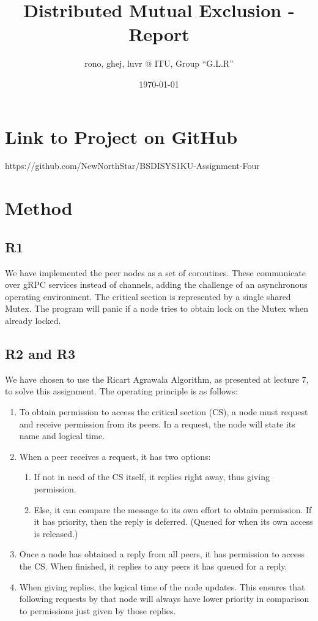 \documentclass[a4paper,11pt]{article}
\title{Distributed Mutual Exclusion - Report}
\author{rono, ghej, luvr @ ITU, Group ``G.L.R''}
\date{\today}
\begin{document}
\maketitle

\tableofcontents

\pagebreak

\section{Link to Project on GitHub}
https://github.com/NewNorthStar/BSDISYS1KU-Assignment-Four

\section{Method}

\subsection{R1}

We have implemented the peer nodes as a set of coroutines. These communicate over gRPC services instead of channels, adding the challenge of an asynchronous operating environment. The critical section is represented by a single shared Mutex. The program will panic if a node tries to obtain lock on the Mutex when already locked. 

\subsection{R2 and R3}

We have chosen to use the Ricart Agrawala Algorithm, as presented at lecture 7, to solve this assignment. The operating principle is as follows:

\begin{enumerate}
    \item To obtain permission to access the critical section (CS), a node must request and receive permission from its peers. In a request, the node will state its name and logical time. 
    \item When a peer receives a request, it has two options:
    \begin{enumerate}
        \item If not in need of the CS itself, it replies right away, thus giving permission.
        \item Else, it can compare the message to its own effort to obtain permission. If it has priority, then the reply is deferred. (Queued for when its own access is released.)
    \end{enumerate}
    \item Once a node has obtained a reply from all peers, it has permission to access the CS. When finished, it replies to any peers it has queued for a reply.
    \item When giving replies, the logical time of the node updates. This ensures that following requests by that node will always have lower priority in comparison to permissions just given by those replies. 
\end{enumerate}
\end{document}
